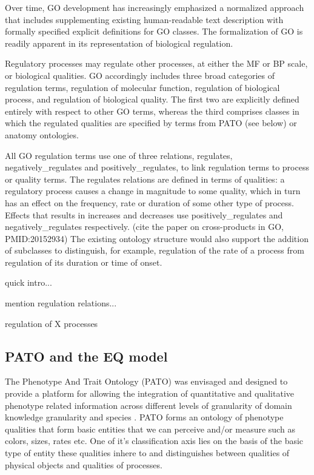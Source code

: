 \documentclass{bioinfo}
\renewcommand{\cite}{\citep}
\begin{document}
Over time, GO development has increasingly emphasized a normalized
approach that includes supplementing existing human-readable text
description with formally specified explicit definitions for GO
classes. The formalization of GO is readily apparent in its
representation of biological regulation.

Regulatory processes may regulate other processes, at either the MF or
BP scale, or biological qualities. GO accordingly includes three broad
categories of regulation terms, regulation of molecular function,
regulation of biological process, and regulation of biological
quality. The first two are explicitly defined entirely with respect to
other GO terms, whereas the third comprises classes in which the
regulated qualities are specified by terms from PATO (see below) or
anatomy ontologies.

All GO regulation terms use one of three relations, regulates,
negatively\_regulates and positively\_regulates, to link regulation
terms to process or quality terms. The regulates relations are defined
in terms of qualities: a regulatory process causes a change in
magnitude to some quality, which in turn has an effect on the
frequency, rate or duration of some other type of process. Effects
that results in increases and decreases use positively\_regulates and
negatively\_regulates respectively. \cite{} (cite the paper on
cross-products in GO, PMID:20152934) The existing ontology structure
would also support the addition of subclasses to distinguish, for
example, regulation of the rate of a process from regulation of its
duration or time of onset.

quick intro...

mention regulation relations... 

regulation of X processes

\subsection{PATO and the EQ model}
The Phenotype And Trait Ontology (PATO) was envisaged and designed to
provide a platform for allowing the integration of quantitative and
qualitative phenotype related information across different levels of
granularity of domain knowledge granularity and species
\cite{Gkoutos2005}.  PATO forms an ontology of phenotype qualities
that form basic entities that we can perceive and/or measure such as
colors, sizes, rates etc. One of it's classification axis lies on the
basis of the basic type of entity these qualities inhere to and
distinguishes between qualities of physical objects and qualities of
processes.
\end{document}
